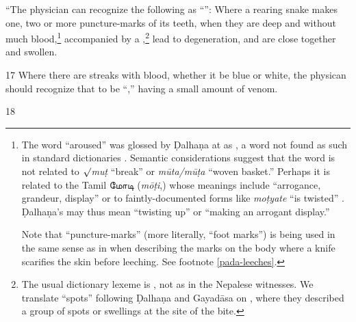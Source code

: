 \begin{translation}
“The physician can recognize the following as “”:
Where a rearing snake  makes one, two or more puncture-marks of
its teeth, when they are deep and without much
blood,\footnote{\label{pada-snakes} The word  “aroused” was
    glossed by Ḍalhaṇa at  as , a word not found as
    such in standard dictionaries
    \citep{moni-sans,apte-prac,mayr-kurz,josi-maha}. Semantic considerations
    suggest that the word is not related to $\surd$\emph{muṭ} “break” or
    \emph{mūta/mūṭa} “woven basket.” Perhaps it is related to the Tamil
    \texttamil{மோடி} (\emph{mōṭi},) whose meanings include “arrogance, grandeur,
    display” \citep[\#5133]{burr-1984} or to faintly-documented forms like
    \emph{moṭyate} “is twisted” \citep[\#10186]{CDIAL}. Ḍalhaṇa's 
    may thus mean “twisting up” or “making an arrogant display.” \par Note that
     “puncture-marks” (more literally, “foot marks”) is being used in
    the same sense as in  when describing the marks on the body
    where a knife scarifies the skin before leeching. See footnote
    \ref{pada-leeches}.} accompanied by a ,\footnote{The usual dictionary lexeme is , not 
        as in the Nepalese witnesses.  We translate “spots” following Ḍalhaṇa and
        Gayadāsa on , where they described a group of spots or
        swellings at the site of the bite.} lead to degeneration, and are close
        together and swollen.

\item [17]  Where there are streaks with blood, whether it be blue or white, the 
physican should recognize that to be “,” having a small amount of 
venom. 

\item [18]
    
\end{translation}